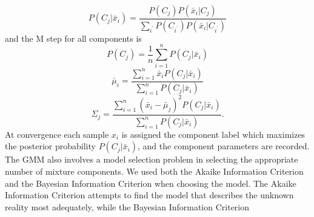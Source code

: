 \documentclass{article}
\begin{document}
\begin{equation}
P(C_j|\bar{x}_i) = \frac{P(C_j)P(\bar{x}_i|C_j)}{\sum_{i^{'}}P(C_{i^{'}})P(\bar{x}_i|C_{i^{'}})}
\end{equation}
and the M step for all components is
\begin{equation}
P(C_j) = \frac{1}{n}\sum_{i=1}^nP(C_j|\bar{x}_i) 
\end{equation}
\begin{equation}
\bar{\mu}_i = \frac{\sum_{i=1}^n\bar{x}_iP(C_j|\bar{x}_i)}{\sum_{i=1}^n P(C_j|\bar{x}_i)} 
\end{equation}
\begin{equation}
\Sigma_j = \frac{\sum_{i=1}^n(\bar{x}_i - 
\bar{\mu}_j)^2P(C_j|\bar{x}_i)}{\sum_{i=1}^n P(C_j|\bar{x}_i)}.
\end{equation}
At convergence each sample $x_i$ is assigned the component label which maximizes the posterior probability $P(C_j|\bar{x}_i)$, and the component parameters are recorded. 
\newline
\indent
The GMM also involves a model selection problem in selecting the appropriate number of mixture components. We used both the Akaike Information Criterion and the Bayesian Information Criterion when choosing the model. The Akaike Information Criterion attempts to find the model that describes the unknown reality most adequately, while the Bayesian Information Criterion 
\end{document}
